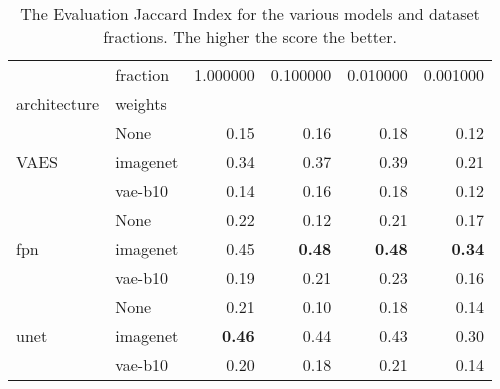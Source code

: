\begin{table}[ht]
\centering
\caption{The Evaluation Jaccard Index for the various models and dataset fractions. The higher the score the better.}
\label{tab:data_fraction_results}
\begin{tabular}{llrrrr}
\toprule
 & fraction & 1.000000 & 0.100000 & 0.010000 & 0.001000 \\
architecture & weights &  &  &  &  \\
\midrule
\multirow[c]{3}{*}{VAES} & None & 0.15 & 0.16 & 0.18 & 0.12 \\
 & imagenet & 0.34 & 0.37 & 0.39 & 0.21 \\
 & vae-b10 & 0.14 & 0.16 & 0.18 & 0.12 \\
\multirow[c]{3}{*}{fpn} & None & 0.22 & 0.12 & 0.21 & 0.17 \\
 & imagenet & 0.45 & \textbf{0.48} & \textbf{0.48} & \textbf{0.34} \\
 & vae-b10 & 0.19 & 0.21 & 0.23 & 0.16 \\
\multirow[c]{3}{*}{unet} & None & 0.21 & 0.10 & 0.18 & 0.14 \\
 & imagenet & \textbf{0.46} & 0.44 & 0.43 & 0.30 \\
 & vae-b10 & 0.20 & 0.18 & 0.21 & 0.14 \\
\bottomrule
\end{tabular}
\end{table}
